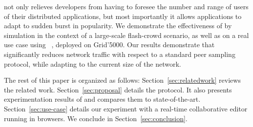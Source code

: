 \SPRAY not only relieves developers from having to foresee the number
and range of users of their distributed applications, but most
importantly it allows applications to adapt to sudden burst in
popularity. We demonstrate the effectiveness of \SPRAY by simulation
in the context of a large-scale flash-crowd scenario, as well as on a
real use case using \CRATE~\cite{nedelec2016crate}, deployed on
Grid'5000. Our results demonstrate that \SPRAY significantly reduces
network traffic with respect to a standard peer sampling protocol,
while adapting to the current size of the network. 


The rest of this paper is organized as follows: Section~\ref{sec:relatedwork}
reviews the related work. Section~\ref{sec:proposal} details the \SPRAY
protocol. It also presents experimentation results of \SPRAY and compares them
to state-of-the-art. Section~\ref{sec:use-case} details our experiment with
\CRATE a real-time collaborative editor running in browsers. We conclude in
Section~\ref{sec:conclusion}.

